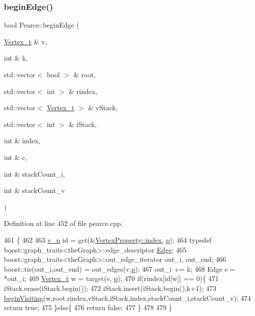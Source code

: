 \subsubsection{\texorpdfstring{begin\+Edge()}{beginEdge()}}
{\footnotesize\ttfamily bool Pearce\+::begin\+Edge (\begin{DoxyParamCaption}\item[{\hyperlink{class_graph_component_ae67114a6ce5a001dc35e1996e1b45aa0}{Vertex\+\_\+t} \&}]{v,  }\item[{int \&}]{k,  }\item[{std\+::vector$<$ bool $>$ \&}]{root,  }\item[{std\+::vector$<$ int $>$ \&}]{rindex,  }\item[{std\+::vector$<$ \hyperlink{class_graph_component_ae67114a6ce5a001dc35e1996e1b45aa0}{Vertex\+\_\+t} $>$ \&}]{v\+Stack,  }\item[{std\+::vector$<$ int $>$ \&}]{i\+Stack,  }\item[{int \&}]{index,  }\item[{int \&}]{c,  }\item[{int \&}]{stack\+Count\+\_\+i,  }\item[{int \&}]{stack\+Count\+\_\+v }\end{DoxyParamCaption})}



Definition at line 452 of file pearce.\+cpp.


\begin{DoxyCode}
461                                            \{
462 
463     \hyperlink{utilities_8h_a3f4959b3d837fa6351a9414c79280286}{v\_p} \textcolor{keywordtype}{id} = \textcolor{keyword}{get}(&\hyperlink{struct_utility_structs_1_1_vertex_property_a636cb729438e999aa3d9a17ac39d8641}{VertexProperty::index}, \hyperlink{class_pearce_a2320928312fd97f6bcb1f16684f79a03}{p});
464     \textcolor{keyword}{typedef} boost::graph\_traits<theGraph>::edge\_descriptor \hyperlink{class_graph_component_aa7517b2af08aa717324076a645c73fe6}{Edge};
465     boost::graph\_traits<theGraph>::out\_edge\_iterator out\_i, out\_end;
466     boost::tie(out\_i,out\_end) = out\_edges(v,\hyperlink{class_pearce_a2320928312fd97f6bcb1f16684f79a03}{p});
467     out\_i += k;
468     Edge e = *out\_i;
469     \hyperlink{utilities_8h_a344cd987714d06997f0becda3c96d6e2}{Vertex\_t} w = target(e, \hyperlink{class_pearce_a2320928312fd97f6bcb1f16684f79a03}{p});
470     \textcolor{keywordflow}{if}(rindex[\textcolor{keywordtype}{id}[w]] == 0)\{
471         iStack.erase(iStack.begin());
472         iStack.insert(iStack.begin(),k+1);
473         \hyperlink{class_pearce_ab9090eeb4466701bc8ba913d8f9f5b50}{beginVisiting}(w,root,rindex,vStack,iStack,index,stackCount\_i,stackCount\_v);
474         \textcolor{keywordflow}{return} \textcolor{keyword}{true};
475     \}\textcolor{keywordflow}{else}\{
476         \textcolor{keywordflow}{return} \textcolor{keyword}{false};
477     \}
478 
479 \}
\end{DoxyCode}
\mbox{\label{class_pearce_ab9090eeb4466701bc8ba913d8f9f5b50}} 
